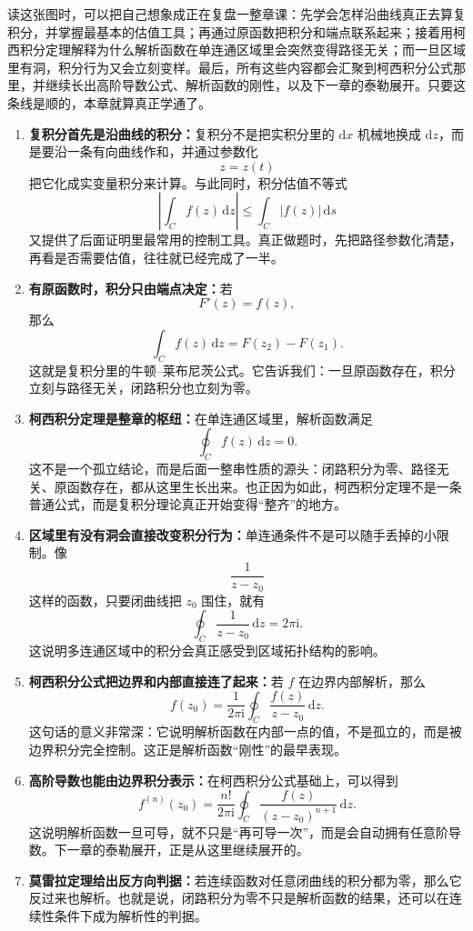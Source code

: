 读这张图时，可以把自己想象成正在复盘一整章课：先学会怎样沿曲线真正去算复积分，并掌握最基本的估值工具；再通过原函数把积分和端点联系起来；接着用柯西积分定理解释为什么解析函数在单连通区域里会突然变得路径无关；而一旦区域里有洞，积分行为又会立刻变样。最后，所有这些内容都会汇聚到柯西积分公式那里，并继续长出高阶导数公式、解析函数的刚性，以及下一章的泰勒展开。只要这条线是顺的，本章就算真正学通了。

\begin{zhongyao}[本章主要结论]
\raggedright
\begin{enumerate}
    \item \textbf{复积分首先是沿曲线的积分：}复积分不是把实积分里的 $\mathrm{d}x$ 机械地换成 $\mathrm{d}z$，而是要沿一条有向曲线作和，并通过参数化
    \[
        z=z(t)
    \]
    把它化成实变量积分来计算。与此同时，积分估值不等式
    \[
        \left|\int_C f(z)\,\mathrm{d}z\right|
        \le \int_C |f(z)|\,\mathrm{d}s
    \]
    又提供了后面证明里最常用的控制工具。真正做题时，先把路径参数化清楚，再看是否需要估值，往往就已经完成了一半。

    \item \textbf{有原函数时，积分只由端点决定：}若
    \[
        F'(z)=f(z),
    \]
    那么
    \[
        \int_C f(z)\,\mathrm{d}z=F(z_2)-F(z_1).
    \]
    这就是复积分里的牛顿--莱布尼茨公式。它告诉我们：一旦原函数存在，积分立刻与路径无关，闭路积分也立刻为零。

    \item \textbf{柯西积分定理是整章的枢纽：}在单连通区域里，解析函数满足
    \[
        \oint_C f(z)\,\mathrm{d}z=0.
    \]
    这不是一个孤立结论，而是后面一整串性质的源头：闭路积分为零、路径无关、原函数存在，都从这里生长出来。也正因为如此，柯西积分定理不是一条普通公式，而是复积分理论真正开始变得``整齐''的地方。

    \item \textbf{区域里有没有洞会直接改变积分行为：}单连通条件不是可以随手丢掉的小限制。像
    \[
        \frac{1}{z-z_0}
    \]
    这样的函数，只要闭曲线把 $z_0$ 围住，就有
    \[
        \oint_C \frac{1}{z-z_0}\,\mathrm{d}z=2\pi\mathrm{i}.
    \]
    这说明多连通区域中的积分会真正感受到区域拓扑结构的影响。

    \item \textbf{柯西积分公式把边界和内部直接连了起来：}若 $f$ 在边界内部解析，那么
    \[
        f(z_0)=\frac{1}{2\pi\mathrm{i}}\oint_C \frac{f(z)}{z-z_0}\,\mathrm{d}z.
    \]
    这句话的意义非常深：它说明解析函数在内部一点的值，不是孤立的，而是被边界积分完全控制。这正是解析函数``刚性''的最早表现。

    \item \textbf{高阶导数也能由边界积分表示：}在柯西积分公式基础上，可以得到
    \[
        f^{(n)}(z_0)=\frac{n!}{2\pi\mathrm{i}}\oint_C \frac{f(z)}{(z-z_0)^{n+1}}\,\mathrm{d}z.
    \]
    这说明解析函数一旦可导，就不只是``再可导一次''，而是会自动拥有任意阶导数。下一章的泰勒展开，正是从这里继续展开的。

    \item \textbf{莫雷拉定理给出反方向判据：}若连续函数对任意闭曲线的积分都为零，那么它反过来也解析。也就是说，闭路积分为零不只是解析函数的结果，还可以在连续性条件下成为解析性的判据。
\end{enumerate}
\end{zhongyao}

